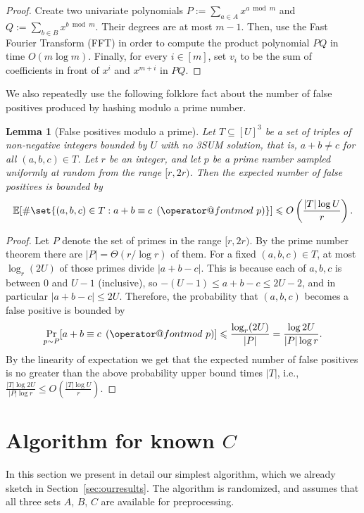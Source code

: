 \documentclass[10pt,a4paper]{article}
\makeatletter
\newtheorem{lemma}{Lemma}[section]
\newcommand{\E}{\mathbb{E}}
\newcommand{\tpmod}[1]{\mkern 8mu({\operator@font mod}\mkern 6mu#1)}
\makeatother
\begin{document}
\begin{proof}
Create two univariate polynomials $P := \sum_{a \in A}x^{a \bmod m}$ and $Q := \sum_{b \in B}x^{b \bmod m}$. Their degrees are at most $m - 1$. Then, use the Fast Fourier Transform (FFT) in order to compute the product polynomial $PQ$ in time $O(m \log m)$. Finally, for every $i \in [m]$, set $v_i$ to be the sum of coefficients in front of $x^i$ and $x^{m+i}$ in $PQ$.
\end{proof}

We also repeatedly use the following folklore fact about the number of false positives produced by hashing modulo a prime number.

\begin{lemma}[False positives modulo a prime]\label{lem:false}
Let $T \subseteq [U]^3$ be a set of triples of non-negative integers bounded by $U$ with no 3SUM solution, that is, $a + b \neq c$ for all $(a,b,c) \in T$. Let $r$ be an integer, and let $p$ be a prime number sampled uniformly at random from the range $[r, 2r)$. Then the expected number of false positives is bounded by
\[\E[\#\set{(a,b,c) \in T : a + b \equiv c \tpmod{p}}] \leqslant O\left(\frac{|T|\log U}{r}\right).\]
\end{lemma}

\begin{proof}
Let $P$ denote the set of primes in the range $[r,2r)$. By the prime number theorem there are $|P| = \Theta(r / \log r)$ of them. For a fixed $(a,b,c) \in T$, at most $\log_r(2U)$ of those primes divide $|a+b-c|$. This is because each of $a,b,c$ is between $0$ and $U-1$ (inclusive), so $-(U-1) \leqslant a+b-c \leqslant 2U - 2$, and in particular $|a+b-c| \leqslant 2U$. Therefore, the probability that $(a,b,c)$ becomes a false positive is bounded by
\[\operatornamewithlimits{Pr}_{p \sim P}[a + b \equiv c \tpmod{p}] \leqslant \frac{\log_r(2U)}{|P|} = \frac{\log 2U}{|P| \log r}.\]
By the linearity of expectation we get that the expected number of false positives is no greater than the above probability upper bound times $|T|$, i.e., $\frac{|T|\log 2U}{|P| \log r} \leqslant O(\frac{|T|\log U}{r})$.
\end{proof}
        
\section{Algorithm for known \texorpdfstring{$C$}{C}}
\label{sec:knownc}

In this section we present in detail our simplest algorithm, which we already sketch in Section~\ref{sec:ourresults}. The algorithm is randomized, and assumes that all three sets $A$, $B$, $C$ are available for preprocessing.
    
\end{document}
